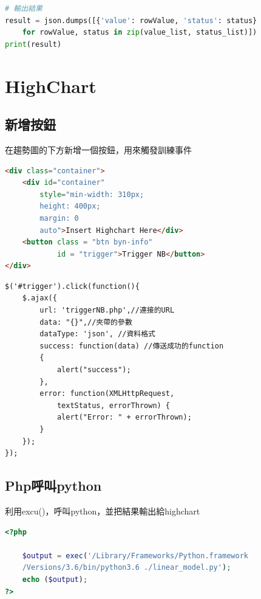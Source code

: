 \documentclass[12pt,a4paper]{article}
\begin{document}
{{\begin{shaded}
\begin{lstlisting}[language=Python]
# 輸出結果
result = json.dumps([{'value': rowValue, 'status': status} 
	for rowValue, status in zip(value_list, status_list)])
print(result)
\end{lstlisting}
\end{shaded}

\section{HighChart}
\subsection{新增按鈕}
在趨勢圖的下方新增一個按鈕，用來觸發訓練事件

\begin{shaded}
\begin{lstlisting}[language=Html]
<div class="container">
	<div id="container" 
		style="min-width: 310px; 
		height: 400px; 
		margin: 0 
		auto">Insert Highchart Here</div>
	<button class = "btn byn-info" 
			id = "trigger">Trigger NB</button>
</div>
\end{lstlisting}
\end{shaded}

\begin{shaded}
\begin{lstlisting}[language=Html]
$('#trigger').click(function(){
	$.ajax({
		url: 'triggerNB.php',//連接的URL	 
		data: "{}",//夾帶的參數
		dataType: 'json', //資料格式
		success: function(data)	//傳送成功的function
		{
			alert("success");
		},
		error: function(XMLHttpRequest, 
			textStatus, errorThrown) {
            alert("Error: " + errorThrown); 
        }
	});
});
\end{lstlisting}
\end{shaded}

\subsection{Php呼叫python}
利用excu()，呼叫python，並把結果輸出給highchart

\begin{shaded}
\begin{lstlisting}[language=Php]
<?php

	$output = exec('/Library/Frameworks/Python.framework
	/Versions/3.6/bin/python3.6 ./linear_model.py');
	echo ($output);
?>
\end{lstlisting}
\end{shaded}

}}
\end{document}

